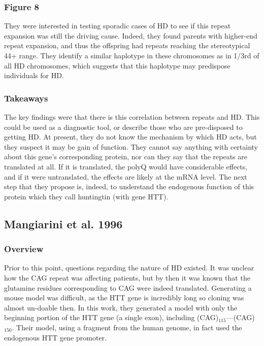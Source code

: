 \documentclass[12pt]{report}
\begin{document}
\subsubsection{Figure 8}

They were interested in testing sporadic cases of HD to see if this repeat expansion was still the driving cause. Indeed, they found parents with higher-end repeat expansion, and thus the offspring had repeats reaching the stereotypical 44+ range. They identify a similar haplotype in these chromosomes as in 1/3rd of all HD chromosomes, which suggests that this haplotype may predispose individuals for HD. 

\subsubsection{Takeaways}

The key findings were that there is this correlation between repeats and HD. This could be used as a diagnostic tool, or describe those who are pre-disposed to getting HD. At present, they do not know the mechanism by which HD acts, but they suspect it may be gain of function. They cannot say anything with certainty about this gene's corresponding protein, nor can they say that the repeats are translated at all. If it is translated, the polyQ would have considerable effects, and if it were untranslated, the effects are likely at the mRNA level. The next step that they propose is, indeed, to understand the endogenous function of this protein which they call huntingtin (with gene HTT). 


\subsection{Mangiarini et al. 1996}

\subsubsection{Overview}

Prior to this point, questions regarding the nature of HD existed. It was unclear how the CAG repeat was affecting patients, but by then it was known that the glutamine residues corresponding to CAG were indeed translated. Generating a mouse model was difficult, as the HTT gene is incredibly long so cloning was almost un-doable then. In this work, they generated a model with only the beginning portion of the HTT gene (a single exon), including (CAG)$_{115}$---(CAG)$_{150}$. Their model, using a fragment from the human genome, in fact used the endogenous HTT gene promoter.\newline
\end{document}
